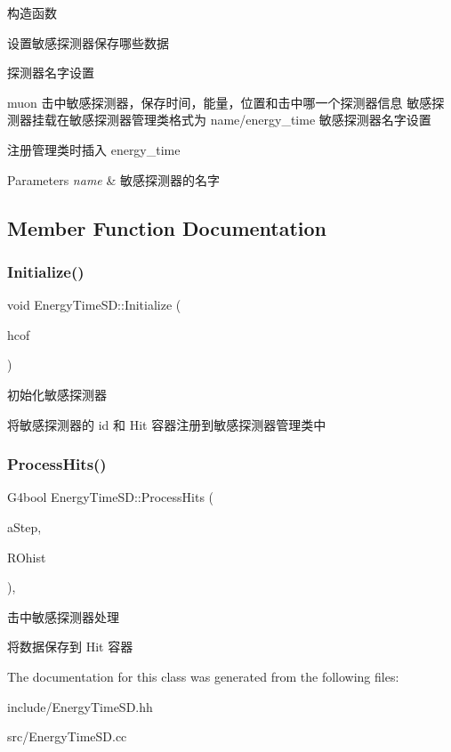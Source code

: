 构造函数 

设置敏感探测器保存哪些数据

探测器名字设置

muon 击中敏感探测器，保存时间，能量，位置和击中哪一个探测器信息 敏感探测器挂载在敏感探测器管理类格式为 name/energy\+\_\+time 敏感探测器名字设置

注册管理类时插入 energy\+\_\+time


\begin{DoxyParams}{Parameters}
{\em name} & 敏感探测器的名字 \\
\hline
\end{DoxyParams}


\subsection{Member Function Documentation}
\mbox{\label{classEnergyTimeSD_a81809ac7ecdc9eb7bcdc00d489cb9fb3}} 
\subsubsection{\texorpdfstring{Initialize()}{Initialize()}}
{\footnotesize\ttfamily void Energy\+Time\+S\+D\+::\+Initialize (\begin{DoxyParamCaption}\item[{G4\+H\+Cof\+This\+Event $\ast$}]{hcof }\end{DoxyParamCaption})\hspace{0.3cm}{\ttfamily [override]}}



初始化敏感探测器 

将敏感探测器的 id 和 Hit 容器注册到敏感探测器管理类中 \mbox{\label{classEnergyTimeSD_a24131df6ca564ef0a71e49c4625d5477}} 
\subsubsection{\texorpdfstring{Process\+Hits()}{ProcessHits()}}
{\footnotesize\ttfamily G4bool Energy\+Time\+S\+D\+::\+Process\+Hits (\begin{DoxyParamCaption}\item[{G4\+Step $\ast$}]{a\+Step,  }\item[{G4\+Touchable\+History $\ast$}]{R\+Ohist }\end{DoxyParamCaption})\hspace{0.3cm}{\ttfamily [override]}, {\ttfamily [protected]}}



击中敏感探测器处理 

将数据保存到 Hit 容器 

The documentation for this class was generated from the following files\+:\begin{DoxyCompactItemize}
\item 
include/Energy\+Time\+S\+D.\+hh\item 
src/Energy\+Time\+S\+D.\+cc\end{DoxyCompactItemize}
